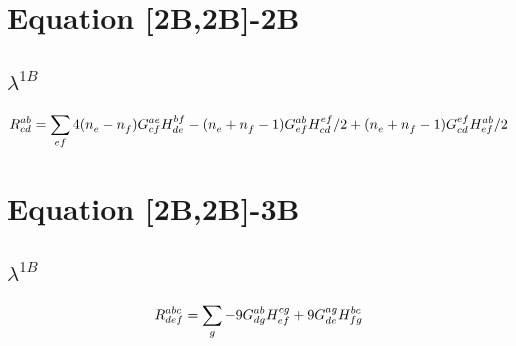 \documentclass{scrartcl}
\begin{document}
\section{Equation [2B,2B]-2B}
\subsection{$\lambda^{1B}$}
\begin{dmath*}
R^{ab}_{cd} = \sum_{ef} 4 \* (n^{}_{e}-n^{}_{f}) \* G^{ae}_{cf} \* H^{bf}_{de}-(n^{}_{e}+n^{}_{f}-1) \* G^{ab}_{ef} \* H^{ef}_{cd}/2+(n^{}_{e}+n^{}_{f}-1) \* G^{ef}_{cd} \* H^{ab}_{ef}/2
\end{dmath*}
\section{Equation [2B,2B]-3B}
\subsection{$\lambda^{1B}$}
\begin{dmath*}
R^{abc}_{def} = \sum_{g} -9 \* G^{ab}_{dg} \* H^{cg}_{ef}+9 \* G^{ag}_{de} \* H^{bc}_{fg}
\end{dmath*}
\end{document}

